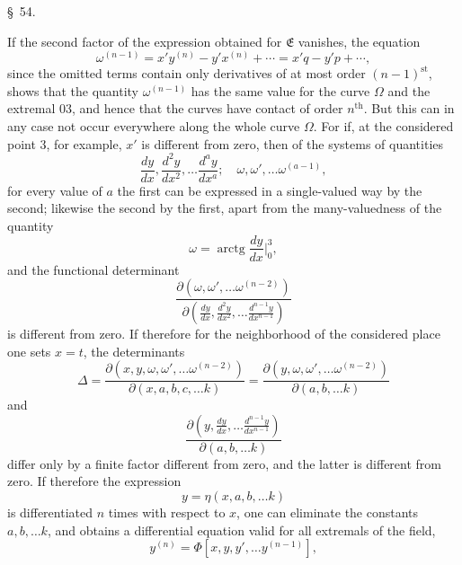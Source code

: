 \documentclass[11pt,a4paper,leqno]{article}
\begin{document}
\begin{center}
{\large \S~54.}
\end{center}

If the second factor of the expression obtained for $\mathfrak{E}$ vanishes, the equation
\[
\omega^{(n-1)}=x'y^{(n)}-y'x^{(n)}+\cdots=x'q-y'p+\cdots,
\]
since the omitted terms contain only derivatives of at most order $(n-1)^{\mathrm{st}}$, shows that the quantity $\omega^{(n-1)}$ has the same value for the curve $\Omega$ and the extremal 03, and hence that the curves have contact of order $n^{\mathrm{th}}$. But this can in any case not occur everywhere along the whole curve $\Omega$. For if, at the considered point 3, for example, $x'$ is different from zero, then of the systems of quantities
\begin{equation}\tag{41}
\frac{dy}{dx},\frac{d^2y}{dx^2},\ldots\frac{d^ay}{dx^a};
\quad \omega,\omega',\ldots\omega^{(a-1)},
\end{equation}
for every value of $a$ the first can be expressed in a single-valued way by the second; likewise the second by the first, apart from the many-valuedness of the quantity
\[
\omega=\operatorname{arctg}\frac{dy}{dx}\bigg|_0^3,
\]
and the functional determinant
\[
\frac{\partial(\omega,\omega',\ldots\omega^{(n-2)})}
{\partial\left(\frac{dy}{dx},\frac{d^2y}{dx^2},\ldots\frac{d^{n-1}y}{dx^{n-1}}\right)}
\]
is different from zero. If therefore for the neighborhood of the considered place one sets $x=t$, the determinants
\[
\Delta=
\frac{\partial(x,y,\omega,\omega',\ldots\omega^{(n-2)})}
{\partial(x,a,b,c,\ldots k)}
=
\frac{\partial(y,\omega,\omega',\ldots\omega^{(n-2)})}
{\partial(a,b,\ldots k)}
\]
and
\[
\frac{\partial\left(y,\frac{dy}{dx},\ldots\frac{d^{n-1}y}{dx^{n-1}}\right)}
{\partial(a,b,\ldots k)}
\]
differ only by a finite factor different from zero, and the latter is different from zero. If therefore the expression
\[
y=\eta(x,a,b,\ldots k)
\]
is differentiated $n$ times with respect to $x$, one can eliminate the constants $a,b,\ldots k$, and obtains a differential equation valid for all extremals of the field,
\begin{equation}\tag{42}
y^{(n)}=\Phi[x,y,y',\ldots y^{(n-1)}],
\end{equation}
\end{document}
